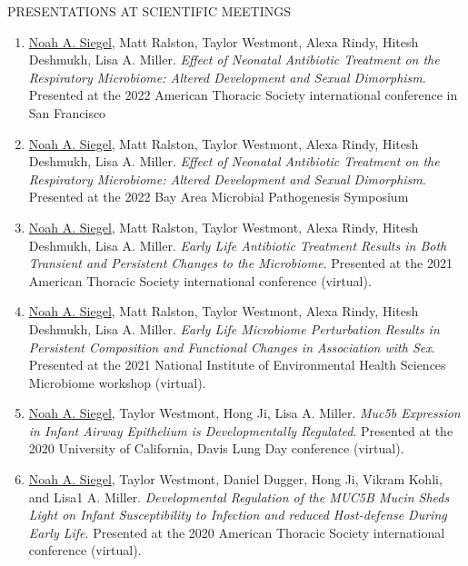 \documentclass{resume} %
\begin{document}
\begin{rSection}{PRESENTATIONS AT SCIENTIFIC MEETINGS}
\begin{enumerate}
\item \underline{Noah A. Siegel}, Matt Ralston, Taylor Westmont, Alexa Rindy, Hitesh Deshmukh, Lisa A. Miller. \emph{Effect of Neonatal Antibiotic Treatment on the Respiratory Microbiome: Altered Development and Sexual Dimorphism}. Presented at the 2022 American Thoracic Society international conference in San Francisco

\item \underline{Noah A. Siegel}, Matt Ralston, Taylor Westmont, Alexa Rindy, Hitesh Deshmukh, Lisa A. Miller. \emph{Effect of Neonatal Antibiotic Treatment on the Respiratory Microbiome: Altered Development and Sexual Dimorphism}. Presented at the 2022 Bay Area Microbial Pathogenesis Symposium

\item \underline{Noah A. Siegel}, Matt Ralston, Taylor Westmont, Alexa Rindy, Hitesh Deshmukh, Lisa A. Miller. \emph{Early Life Antibiotic Treatment Results in Both Transient and Persistent Changes to the Microbiome}. Presented at the 2021 American Thoracic Society international conference (virtual).

\item \underline{Noah A. Siegel}, Matt Ralston, Taylor Westmont, Alexa Rindy, Hitesh Deshmukh, Lisa A. Miller. \emph{Early Life Microbiome Perturbation Results in Persistent Composition and Functional Changes in Association with Sex}. Presented at the 2021 National Institute of Environmental Health Sciences Microbiome workshop (virtual).

\item \underline{Noah A. Siegel}, Taylor Westmont, Hong Ji, Lisa A. Miller. \emph{Muc5b Expression in Infant Airway Epithelium is Developmentally Regulated}. Presented at the 2020 University of California, Davis Lung Day conference (virtual).

\item \underline{Noah A. Siegel}, Taylor Westmont, Daniel Dugger, Hong Ji, Vikram Kohli, and Lisa1 A. Miller. \emph{Developmental Regulation of the MUC5B Mucin Sheds Light on Infant Susceptibility to Infection and reduced Host-defense During Early Life}. Presented at the 2020 American Thoracic Society international conference (virtual).

\end{enumerate}
\end{rSection}
\end{document}

